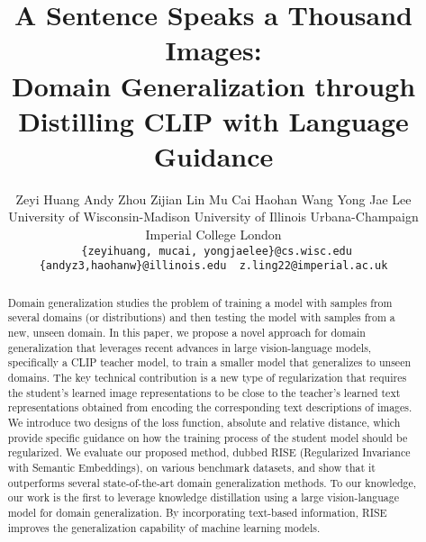 \documentclass[10pt,twocolumn,letterpaper]{article}
\newcommand{\name}{{\color{black} RISE}}
\begin{document}
\title{
A Sentence Speaks a Thousand Images:\\
Domain Generalization through Distilling CLIP with Language Guidance
}

\author{
Zeyi Huang \hspace{0.6cm} Andy Zhou \hspace{0.6cm} Zijian Lin \hspace{0.6cm} Mu Cai \hspace{0.6cm} Haohan Wang \hspace{0.6cm} Yong Jae Lee 
\\
{University of Wisconsin-Madison \hspace{0.3cm} University of Illinois Urbana-Champaign} \hspace{0.3cm} Imperial College London\\
\tt\small{ \{zeyihuang, mucai, yongjaelee\}}@cs.wisc.edu  \tt\small{ \{andyz3,haohanw\}}@illinois.edu  \tt\small{ z.ling22}@imperial.ac.uk\\
}

\maketitle
\ificcvfinal\thispagestyle{empty}\fi

\begin{abstract}


Domain generalization studies the problem of training a model with samples from several domains (or distributions)
and then testing the model with samples from a new, unseen domain.
In this paper, 
we propose a novel approach for domain generalization that leverages recent advances in large vision-language models, specifically a CLIP teacher model, to train a smaller model that generalizes to unseen domains. The key technical contribution is a new type of regularization that requires the student's learned image representations to be close to the teacher's learned text representations obtained from encoding the corresponding text descriptions of images. 
We introduce two designs of the loss function, absolute and relative distance, which provide specific guidance on how the training process of the student model should be regularized. 
We evaluate our proposed method,
dubbed \name{} (Regularized Invariance with Semantic Embeddings),
on various benchmark datasets, and show that it outperforms several state-of-the-art domain generalization methods. 
To our knowledge, our work is the first to leverage knowledge distillation using a large vision-language model for domain generalization. By incorporating text-based information, \name{} improves the generalization capability of machine learning models.




\end{abstract}
\end{document}
